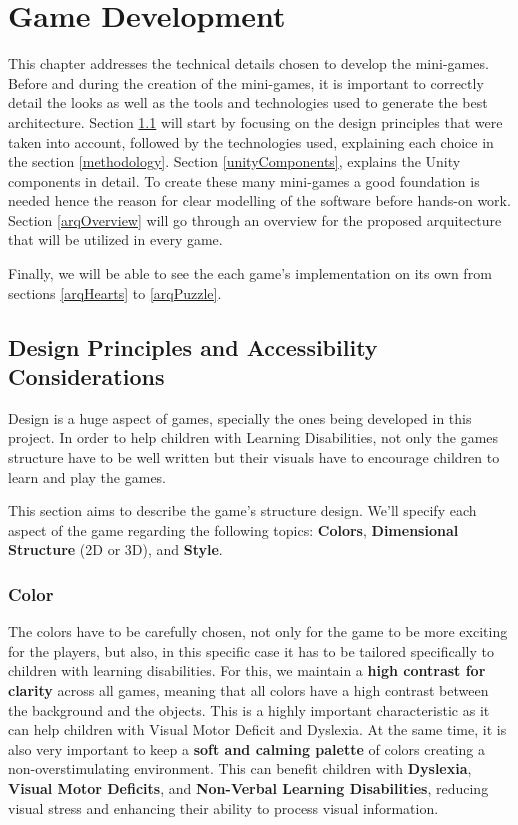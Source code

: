 \raggedbottom

\chapter{Game Development}
\label{cha:game_development}

This chapter addresses the technical details chosen to develop the mini-games. Before and during the creation of the mini-games, it is important to correctly detail the looks as well as the tools and technologies used to generate the best architecture.
Section \ref{designPriciples} will start by focusing on the design principles that were taken into account, followed by the technologies used, explaining each choice in the section \ref{methodology}. Section \ref{unityComponents}, explains the Unity components in detail. To create these many mini-games a good foundation is needed hence the reason for clear modelling of the software before hands-on work. Section \ref{arqOverview} will go through an overview for the proposed arquitecture that will be utilized in every game.

Finally, we will be able to see the each game's implementation on its own from sections \ref{arqHearts} to \ref{arqPuzzle}.

\newpage
\section{Design Principles and Accessibility Considerations}
\label{designPriciples}

Design is a huge aspect of games, specially the ones being developed in this project. In order to help children with Learning Disabilities, not only the games structure have to be well written but their visuals have to encourage children to learn and play the games.

This section aims to describe the game's structure design. We'll specify each aspect of the game regarding the following topics: \textbf{Colors}, \textbf{Dimensional Structure} (2D or 3D), and \textbf{Style}.

\subsection*{Color}
The colors have to be carefully chosen, not only for the game to be more exciting for the players, but also, in this specific case it has to be tailored specifically to children with learning disabilities.
For this, we maintain a \textbf{high contrast for clarity} across all games, meaning that all colors have a high contrast between the background and the objects. This is a highly important characteristic as it can help children with Visual Motor Deficit and Dyslexia.
At the same time, it is also very important to keep a \textbf{soft and calming palette} of colors creating a non-overstimulating environment. This can benefit children with \textbf{Dyslexia}, \textbf{Visual Motor Deficits}, and \textbf{Non-Verbal Learning Disabilities}, reducing visual stress and enhancing their ability to process visual information.

